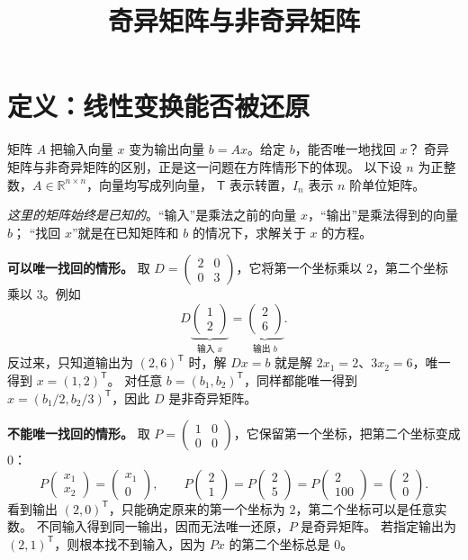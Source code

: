 \documentclass[UTF8,12pt,a4paper,fontset=fandol]{ctexart}
\title{奇异矩阵与非奇异矩阵}
\author{}
\date{}
\begin{document}
\maketitle

\section{定义：线性变换能否被还原}

矩阵 $A$ 把输入向量 $x$ 变为输出向量 $b=Ax$。给定 $b$，能否唯一地找回 $x$？
奇异矩阵与非奇异矩阵的区别，正是这一问题在方阵情形下的体现。
以下设 $n$ 为正整数，$A\in\mathbb R^{n\times n}$，向量均写成列向量，
$\mathsf T$ 表示转置，$I_n$ 表示 $n$ 阶单位矩阵。

\begin{inputoutputbox}
\emph{这里的矩阵始终是已知的}。“输入”是乘法之前的向量 $x$，“输出”是乘法得到的向量 $b$；
“找回 $x$”就是在已知矩阵和 $b$ 的情况下，求解关于 $x$ 的方程。

\textbf{可以唯一找回的情形。}
取 $D=\begin{pmatrix}2&0\\0&3\end{pmatrix}$，它将第一个坐标乘以 $2$，第二个坐标乘以 $3$。例如
\[
  D\underbrace{\begin{pmatrix}1\\2\end{pmatrix}}_{\text{输入 }x}
  =\underbrace{\begin{pmatrix}2\\6\end{pmatrix}}_{\text{输出 }b}.
\]
反过来，只知道输出为 $(2,6)^{\mathsf T}$ 时，解 $Dx=b$ 就是解
$2x_1=2$、$3x_2=6$，唯一得到 $x=(1,2)^{\mathsf T}$。
对任意 $b=(b_1,b_2)^{\mathsf T}$，同样都能唯一得到
$x=(b_1/2,b_2/3)^{\mathsf T}$，因此 $D$ 是非奇异矩阵。

\textbf{不能唯一找回的情形。}
取 $P=\begin{pmatrix}1&0\\0&0\end{pmatrix}$，它保留第一个坐标，把第二个坐标变成 $0$：
\[
  P\begin{pmatrix}x_1\\x_2\end{pmatrix}=\begin{pmatrix}x_1\\0\end{pmatrix},
  \qquad
  P\begin{pmatrix}2\\1\end{pmatrix}
  =P\begin{pmatrix}2\\5\end{pmatrix}
  =P\begin{pmatrix}2\\100\end{pmatrix}
  =\begin{pmatrix}2\\0\end{pmatrix}.
\]
看到输出 $(2,0)^{\mathsf T}$，只能确定原来的第一个坐标为 $2$，第二个坐标可以是任意实数。
不同输入得到同一输出，因而无法唯一还原，$P$ 是奇异矩阵。
若指定输出为 $(2,1)^{\mathsf T}$，则根本找不到输入，因为 $Px$ 的第二个坐标总是 $0$。


\end{inputoutputbox}
\end{document}
